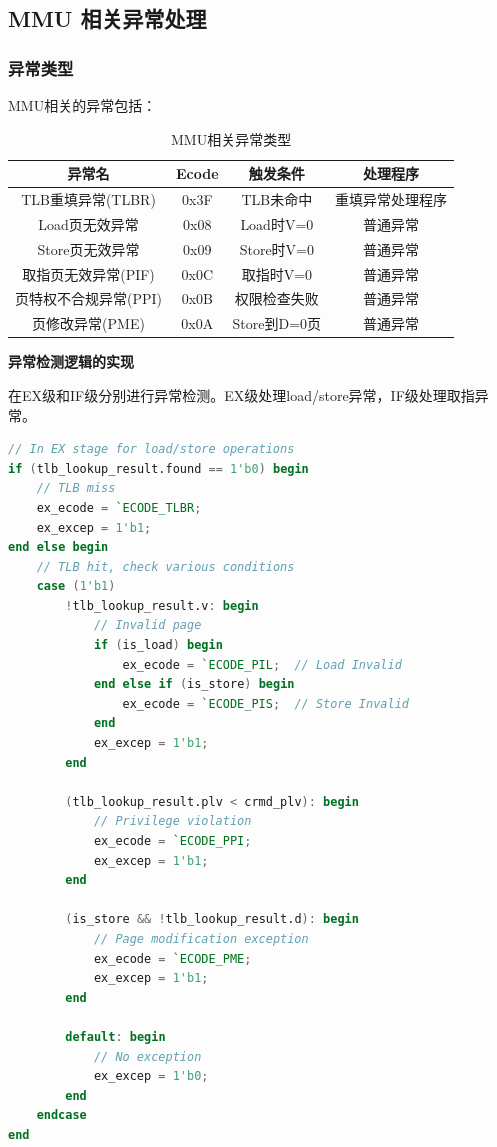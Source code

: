 \subsection{MMU 相关异常处理}

\subsubsection{异常类型}

MMU相关的异常包括：

\begin{table}[H]
\centering
\caption{MMU相关异常类型}
\begin{tabular}{|c|c|c|c|}
\hline
\textbf{异常名} & \textbf{Ecode} & \textbf{触发条件} & \textbf{处理程序} \\
\hline
TLB重填异常(TLBR) & 0x3F & TLB未命中 & 重填异常处理程序 \\
\hline
Load页无效异常 & 0x08 & Load时V=0 & 普通异常 \\
\hline
Store页无效异常 & 0x09 & Store时V=0 & 普通异常 \\
\hline
取指页无效异常(PIF) & 0x0C & 取指时V=0 & 普通异常 \\
\hline
页特权不合规异常(PPI) & 0x0B & 权限检查失败 & 普通异常 \\
\hline
页修改异常(PME) & 0x0A & Store到D=0页 & 普通异常 \\
\hline
\end{tabular}
\end{table}

\textbf{异常检测逻辑的实现}

在EX级和IF级分别进行异常检测。EX级处理load/store异常，IF级处理取指异常。

\begin{lstlisting}[language=Verilog, caption=EX级地址转换异常检测]
// In EX stage for load/store operations
if (tlb_lookup_result.found == 1'b0) begin
    // TLB miss
    ex_ecode = `ECODE_TLBR;
    ex_excep = 1'b1;
end else begin
    // TLB hit, check various conditions
    case (1'b1)
        !tlb_lookup_result.v: begin
            // Invalid page
            if (is_load) begin
                ex_ecode = `ECODE_PIL;  // Load Invalid
            end else if (is_store) begin
                ex_ecode = `ECODE_PIS;  // Store Invalid
            end
            ex_excep = 1'b1;
        end
        
        (tlb_lookup_result.plv < crmd_plv): begin
            // Privilege violation
            ex_ecode = `ECODE_PPI;
            ex_excep = 1'b1;
        end
        
        (is_store && !tlb_lookup_result.d): begin
            // Page modification exception
            ex_ecode = `ECODE_PME;
            ex_excep = 1'b1;
        end
        
        default: begin
            // No exception
            ex_excep = 1'b0;
        end
    endcase
end
\end{lstlisting}

